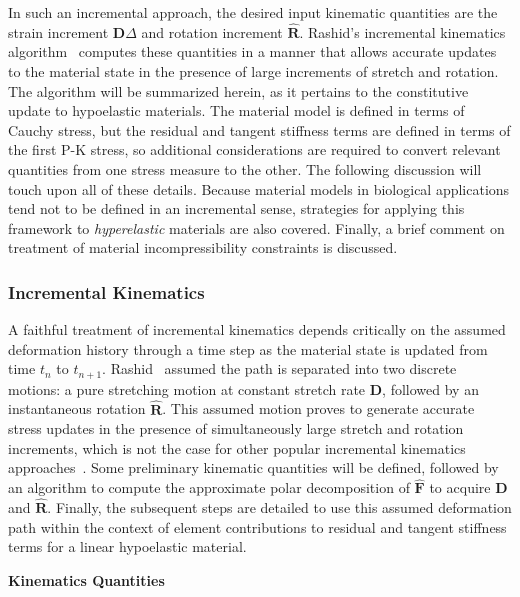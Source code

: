 In such an incremental approach, the desired input kinematic quantities are the strain increment $\bm{D}\Delta$ and rotation increment $\hat{\bm{R}}$. Rashid's incremental kinematics algorithm~\cite{rashid_1993} computes these quantities in a manner that allows accurate updates to the material state in the presence of large increments of stretch and rotation. The algorithm will be summarized herein, as it pertains to the constitutive update to hypoelastic materials. The material model is defined in terms of Cauchy stress, but the residual and tangent stiffness terms are defined in terms of the first P-K stress, so additional considerations are required to convert relevant quantities from one stress measure to the other. The following discussion will touch upon all of these details. Because material models in biological applications tend not to be defined in an incremental sense, strategies for applying this framework to \textit{hyperelastic} materials are also covered. Finally, a brief comment on treatment of material incompressibility constraints is discussed.

\subsubsection{Incremental Kinematics}

A faithful treatment of incremental kinematics depends critically on the assumed deformation history through a time step as the material state is updated from time $t_n$ to $t_{n+1}$. Rashid~\cite{rashid_1993} assumed the path is separated into two discrete motions: a pure stretching motion at constant stretch rate $\bm{D}$, followed by an instantaneous rotation $\hat{\bm{R}}$. This assumed motion proves to generate accurate stress updates in the presence of simultaneously large stretch and rotation increments, which is not the case for other popular incremental kinematics approaches~\cite{rashid_1996}. Some preliminary kinematic quantities will be defined, followed by an algorithm to compute the approximate polar decomposition of $\hat{\bm{F}}$ to acquire $\bm{D}$ and $\hat{\bm{R}}$. Finally, the subsequent steps are detailed to use this assumed deformation path within the context of element contributions to residual and tangent stiffness terms for a linear hypoelastic material.

\textbf{Kinematics Quantities}

